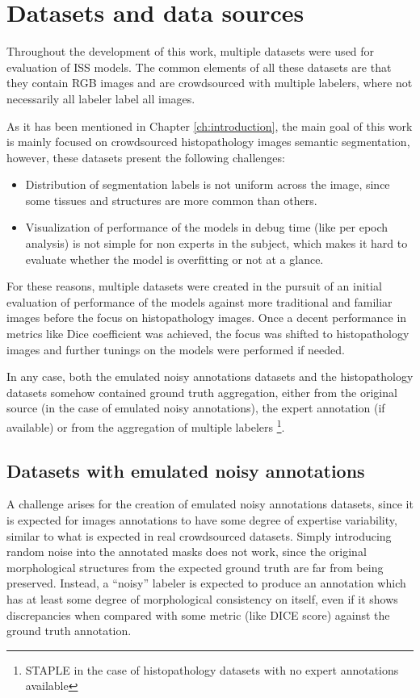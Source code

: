 \section{Datasets and data sources}

Throughout the development of this work, multiple datasets were used
for evaluation of \gls{ISS} models. The common elements of all these datasets
are that they contain RGB images and are crowdsourced with multiple
labelers, where not necessarily all labeler label all images.

As it has been mentioned in Chapter \ref{ch:introduction}, the main goal of this
work is mainly focused on crowdsourced histopathology images semantic
segmentation, however, these datasets present the following challenges:

\begin{itemize}
  \item Distribution of segmentation labels is not uniform across the
    image, since some tissues and structures are more common than others.
  \item Visualization of performance of the models in debug time (like per epoch
    analysis) is not simple for non experts in the subject, which makes it
    hard to evaluate whether the model is overfitting or not at a glance.
\end{itemize}

For these reasons, multiple datasets were created in the pursuit of
an initial evaluation of performance of the models against more traditional
and familiar images before the focus on histopathology images. Once a
decent performance in metrics like Dice coefficient was achieved, the
focus was shifted to histopathology images and further tunings on the models
were performed if needed.

In any case, both the emulated noisy annotations datasets and the
histopathology datasets somehow contained ground truth aggregation, either from
the original source (in the case of emulated noisy annotations), the
expert annotation (if available) or from the aggregation of multiple
labelers \footnote{\gls{STAPLE} in the case of histopathology
datasets with no expert annotations available}.

\subsection{Datasets with emulated noisy annotations}

A challenge arises for the creation of emulated noisy annotations datasets,
since it is expected for images annotations to have some degree of
expertise variability, similar to what is expected in real
crowdsourced datasets.
Simply introducing random noise into the annotated masks does not work,
since the original morphological structures from the expected ground
truth are far from being preserved. Instead, a ``noisy'' labeler is
expected to produce an annotation which has at least some degree of
morphological consistency on itself, even if it shows discrepancies
when compared with some metric (like DICE score) against the ground
truth annotation.


